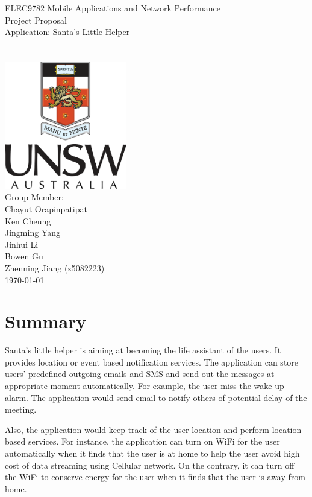 \documentclass[a4paper,12pt]{article}
\author{Zhenning Jiang (z5082223)}
\date{\today}
\begin{document}
	\begin{titlepage}
		\begin{center}
			\Huge{
				ELEC9782 Mobile Applications and Network Performance\\
			}
			\Huge{
				Project Proposal\\
				[1cm]
				Application: Santa's Little Helper\\
			}
			\\
			[2cm]\\
			
			\includegraphics[width = 0.4\textwidth]{UNSW_coat_of_arms.png}\\
			[1.5cm]
			\Large{Group Member: \\
				Chayut Orapinpatipat\\
				Ken Cheung \\
				Jingming Yang\\
				Jinhui Li\\
				Bowen Gu\\
				Zhenning Jiang (z5082223)\\
				[0.7cm]
				\today\\
				[0.7cm]
			}		
		\end{center}
	\end{titlepage}
    \newpage
	
	\section{Summary}
	Santa's little helper is aiming at becoming the life assistant of the users. It provides location or event based notification services. The application can store users' predefined outgoing emails and SMS and send out the messages at appropriate moment automatically. For example, the user miss the wake up alarm. The application would send email to notify others of potential delay of the meeting.
	
	Also, the application would keep track of the user location and perform location based services. For instance, the application can turn on WiFi for the user automatically when it finds that the user is at home to help the user avoid high cost of data streaming using Cellular network. On the contrary, it can turn off the WiFi to conserve energy for the user when it finds that the user is away from home. 
	
\end{document}
